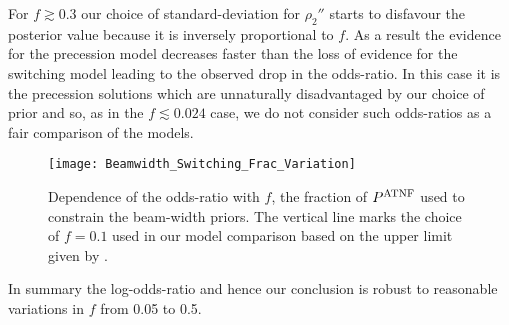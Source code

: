 \documentclass[../full_thesis/full_thesis.tex]{subfiles}
\begin{document}
For $f \gtrsim 0.3$ our choice of standard-deviation for $\rho_2''$ starts to
disfavour the posterior value because it is inversely proportional to $f$. As
a result the evidence for the precession model decreases faster than the loss of
evidence for the switching model leading to the observed drop in the odds-ratio.
In this case it is the precession solutions which are unnaturally disadvantaged
by our choice of prior and so, as in the $f\lesssim 0.024$ case, we do not consider
such odds-ratios as a fair comparison of the models.

\begin{figure}[htb]
\centering
\texttt{[image: Beamwidth\_Switching\_Frac\_Variation]}
\caption{Dependence of the
         odds-ratio with $f$, the fraction of $P^{\mathrm{ATNF}}$ used to constrain the
         beam-width priors. The vertical line
         marks the choice of $f=0.1$ used in our model comparison based on the
         upper limit given by \citet{Lyne1988}.}
\label{fig: beamwidth switching frac variation}
\end{figure}

In summary the log-odds-ratio and hence our conclusion is robust to reasonable
variations in $f$ from 0.05 to 0.5.
\end{document}
